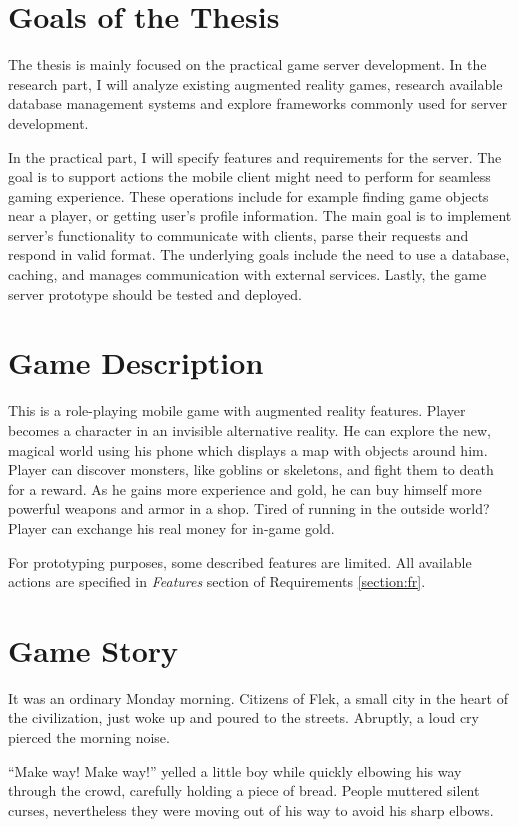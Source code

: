 \section{Goals of the Thesis}
The thesis is mainly focused on the practical game server development. In the research part, I will analyze existing augmented reality games, research available database management systems and explore frameworks commonly used for server development.

In the practical part, I will specify features and requirements for the server. The goal is to support actions the mobile client might need to perform for seamless gaming experience. These operations include for example finding game objects near a player, or getting user's profile information. The main goal is to implement server's functionality to communicate with clients, parse their requests and respond in valid format. The underlying goals include the need to use a database, caching, and manages communication with external services. Lastly, the game server prototype should be tested and deployed.	

\section{Game Description}
This is a role-playing mobile game with augmented reality features. Player becomes a character in an invisible alternative reality. He can explore the new, magical world using his phone which displays a map with objects around him. Player can discover monsters, like goblins or skeletons, and fight them to death for a reward. As he gains more experience and gold, he can buy himself more powerful weapons and armor in a shop. Tired of running in the outside world? Player can exchange his real money for in-game gold.

For prototyping purposes, some described features are limited. All available actions are specified in \textit{Features} section of Requirements \ref{section:fr}.

\section{Game Story}
It was an ordinary Monday morning. Citizens of Flek, a small city in the heart of the civilization, just woke up and poured to the streets. Abruptly, a loud cry pierced the morning noise. 

“Make way! Make way!” yelled a little boy while quickly elbowing his way through the crowd, carefully holding a piece of bread. People muttered silent curses, nevertheless they were moving out of his way to avoid his sharp elbows.

